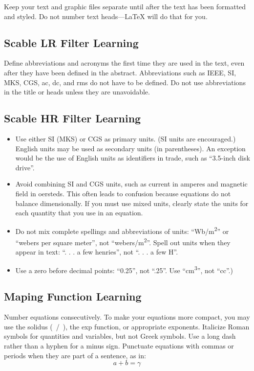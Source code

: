 \documentclass[conference]{IEEEtran}
\begin{document}
Keep your text and graphic files separate until after the text has been 
formatted and styled. Do not number text heads---{\LaTeX} will do that 
for you.

\subsection{Scable LR Filter Learning} \label{AA}
Define abbreviations and acronyms the first time they are used in the text, 
even after they have been defined in the abstract. Abbreviations such as 
IEEE, SI, MKS, CGS, ac, dc, and rms do not have to be defined. Do not use 
abbreviations in the title or heads unless they are unavoidable.

\subsection{Scable HR Filter Learning} \label{SHFL}
\begin{itemize}
\item Use either SI (MKS) or CGS as primary units. (SI units are encouraged.) English units may be used as secondary units (in parentheses). An exception would be the use of English units as identifiers in trade, such as ``3.5-inch disk drive''.
\item Avoid combining SI and CGS units, such as current in amperes and magnetic field in oersteds. This often leads to confusion because equations do not balance dimensionally. If you must use mixed units, clearly state the units for each quantity that you use in an equation.
\item Do not mix complete spellings and abbreviations of units: ``Wb/m\textsuperscript{2}'' or ``webers per square meter'', not ``webers/m\textsuperscript{2}''. Spell out units when they appear in text: ``. . . a few henries'', not ``. . . a few H''.
\item Use a zero before decimal points: ``0.25'', not ``.25''. Use ``cm\textsuperscript{3}'', not ``cc''.)
\end{itemize}

\subsection{Maping Function Learning}
Number equations consecutively. To make your 
equations more compact, you may use the solidus (~/~), the exp function, or 
appropriate exponents. Italicize Roman symbols for quantities and variables, 
but not Greek symbols. Use a long dash rather than a hyphen for a minus 
sign. Punctuate equations with commas or periods when they are part of a 
sentence, as in:
\begin{equation}
a+b=\gamma\label{eq}
\end{equation}
\end{document}
